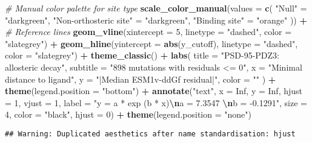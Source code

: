 \documentclass[
]{article}
\newenvironment{Shaded}{\begin{snugshade}}{\end{snugshade}}
\newcommand{\AttributeTok}[1]{\textcolor[rgb]{0.13,0.29,0.53}{#1}}
\newcommand{\CommentTok}[1]{\textcolor[rgb]{0.56,0.35,0.01}{\textit{#1}}}
\newcommand{\ConstantTok}[1]{\textcolor[rgb]{0.56,0.35,0.01}{#1}}
\newcommand{\DecValTok}[1]{\textcolor[rgb]{0.00,0.00,0.81}{#1}}
\newcommand{\FunctionTok}[1]{\textcolor[rgb]{0.13,0.29,0.53}{\textbf{#1}}}
\newcommand{\NormalTok}[1]{#1}
\newcommand{\OtherTok}[1]{\textcolor[rgb]{0.56,0.35,0.01}{#1}}
\newcommand{\SpecialCharTok}[1]{\textcolor[rgb]{0.81,0.36,0.00}{\textbf{#1}}}
\newcommand{\StringTok}[1]{\textcolor[rgb]{0.31,0.60,0.02}{#1}}
\begin{document}
\begin{Shaded}
\begin{Highlighting}[]
  \CommentTok{\# Manual color palette for site type}
  \FunctionTok{scale\_color\_manual}\NormalTok{(}\AttributeTok{values =} \FunctionTok{c}\NormalTok{(}
    \StringTok{"Null"} \OtherTok{=} \StringTok{"darkgreen"}\NormalTok{,}
    \StringTok{"Non{-}orthosteric site"} \OtherTok{=} \StringTok{"darkgreen"}\NormalTok{,}
    \StringTok{"Binding site"} \OtherTok{=} \StringTok{"orange"}
\NormalTok{  )) }\SpecialCharTok{+}
  \CommentTok{\# Reference lines}
  \FunctionTok{geom\_vline}\NormalTok{(}\AttributeTok{xintercept =} \DecValTok{5}\NormalTok{, }\AttributeTok{linetype =} \StringTok{"dashed"}\NormalTok{, }\AttributeTok{color =} \StringTok{"slategrey"}\NormalTok{) }\SpecialCharTok{+}
  \FunctionTok{geom\_hline}\NormalTok{(}\AttributeTok{yintercept =} \FunctionTok{abs}\NormalTok{(y\_cutoff), }\AttributeTok{linetype =} \StringTok{"dashed"}\NormalTok{, }\AttributeTok{color =} \StringTok{"slategrey"}\NormalTok{) }\SpecialCharTok{+}
  \FunctionTok{theme\_classic}\NormalTok{() }\SpecialCharTok{+}
  \FunctionTok{labs}\NormalTok{(}
    \AttributeTok{title =} \StringTok{"PSD{-}95{-}PDZ3: allosteric decay"}\NormalTok{,}
    \AttributeTok{subtitle =} \StringTok{"898 mutations with residuals \textless{}= 0"}\NormalTok{,}
    \AttributeTok{x =} \StringTok{"Minimal distance to ligand"}\NormalTok{,}
    \AttributeTok{y =} \StringTok{"|Median ESM1v{-}ddGf residual|"}\NormalTok{,}
    \AttributeTok{color =} \StringTok{""}
\NormalTok{  )  }\SpecialCharTok{+} \FunctionTok{theme}\NormalTok{(}\AttributeTok{legend.position =} \StringTok{"bottom"}\NormalTok{) }\SpecialCharTok{+}
    \FunctionTok{annotate}\NormalTok{(}\StringTok{"text"}\NormalTok{,  }\AttributeTok{x =} \ConstantTok{Inf}\NormalTok{, }\AttributeTok{y =} \ConstantTok{Inf}\NormalTok{,}
             \AttributeTok{hjust =} \DecValTok{1}\NormalTok{, }\AttributeTok{vjust =} \DecValTok{1}\NormalTok{,}
           \AttributeTok{label =} \StringTok{"y = a * exp (b * x)}\SpecialCharTok{\textbackslash{}n}\StringTok{a = 7.3547  }\SpecialCharTok{\textbackslash{}n}\StringTok{b = {-}0.1291"}\NormalTok{,}
           \AttributeTok{size =} \DecValTok{4}\NormalTok{, }\AttributeTok{color =} \StringTok{"black"}\NormalTok{, }\AttributeTok{hjust =} \DecValTok{0}\NormalTok{) }\SpecialCharTok{+} \FunctionTok{theme}\NormalTok{(}\AttributeTok{legend.position =} \StringTok{"none"}\NormalTok{)}
\end{Highlighting}
\end{Shaded}

\begin{verbatim}
## Warning: Duplicated aesthetics after name standardisation: hjust
\end{verbatim}
\end{document}
